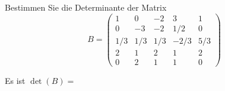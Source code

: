 \documentclass{ximera}
\begin{document}
\begin{question}
    Bestimmen Sie die Determinante der Matrix
\[
B = \left(
\begin{array}{ccccc}
1&0&-2&3&1 \\
0&-3&-2& 1/2& 0 \\
1/3& 1/3& 1/3& -2/3& 5/3 \\
2&1&2&1&2 \\
0&2&1&1&0  
\end{array}
\right)
\]
\begin{solution}
Es ist $\det(B) =$ 
\end{solution}
\end{question}
\end{document}
